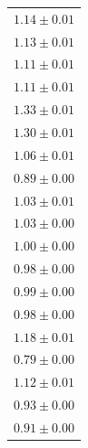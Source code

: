 \begin{tabular}{l}
$1.14 \pm 0.01$ \\
$1.13 \pm 0.01$ \\
$1.11 \pm 0.01$ \\
$1.11 \pm 0.01$ \\
$1.33 \pm 0.01$ \\
$1.30 \pm 0.01$ \\
$1.06 \pm 0.01$ \\
$0.89 \pm 0.00$ \\
$1.03 \pm 0.01$ \\
$1.03 \pm 0.00$ \\
$1.00 \pm 0.00$ \\
$0.98 \pm 0.00$ \\
$0.99 \pm 0.00$ \\
$0.98 \pm 0.00$ \\
$1.18 \pm 0.01$ \\
$0.79 \pm 0.00$ \\
$1.12 \pm 0.01$ \\
$0.93 \pm 0.00$ \\
$0.91 \pm 0.00$ \\
\bottomrule
\end{tabular}
